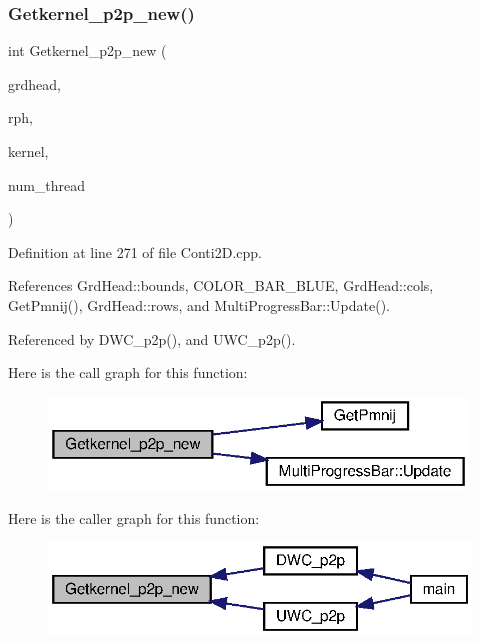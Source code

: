 \subsubsection{Getkernel\+\_\+p2p\+\_\+new()\hspace{0.1cm}{\footnotesize\ttfamily [1/2]}}
{\footnotesize\ttfamily int Getkernel\+\_\+p2p\+\_\+new (\begin{DoxyParamCaption}\item[{\textbf{ Grd\+Head}}]{grdhead,  }\item[{double}]{rph,  }\item[{double $\ast$$\ast$}]{kernel,  }\item[{int}]{num\+\_\+thread }\end{DoxyParamCaption})}



Definition at line 271 of file Conti2\+D.\+cpp.



References Grd\+Head\+::bounds, C\+O\+L\+O\+R\+\_\+\+B\+A\+R\+\_\+\+B\+L\+UE, Grd\+Head\+::cols, Get\+Pmnij(), Grd\+Head\+::rows, and Multi\+Progress\+Bar\+::\+Update().



Referenced by D\+W\+C\+\_\+p2p(), and U\+W\+C\+\_\+p2p().

Here is the call graph for this function\+:\nopagebreak
\begin{figure}[H]
\begin{center}
\leavevmode
\includegraphics[width=316pt]{Conti2D_8cpp_a6f44a06f2b4926f66481fccf277bea50_a6f44a06f2b4926f66481fccf277bea50_cgraph}
\end{center}
\end{figure}
Here is the caller graph for this function\+:\nopagebreak
\begin{figure}[H]
\begin{center}
\leavevmode
\includegraphics[width=321pt]{Conti2D_8cpp_a6f44a06f2b4926f66481fccf277bea50_a6f44a06f2b4926f66481fccf277bea50_icgraph}
\end{center}
\end{figure}
\mbox{\label{Conti2D_8cpp_a1d72c3a10bd62305a91d64bb0de2b247_a1d72c3a10bd62305a91d64bb0de2b247}} 

